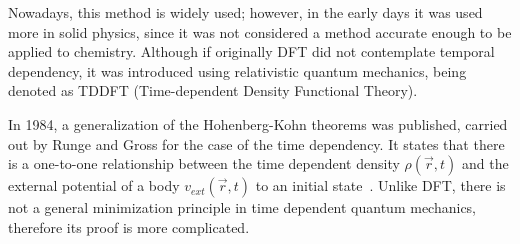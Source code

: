 Nowadays, this method is widely used; however, in the early days it was used
more in solid physics, since it was not considered a method accurate enough to
be applied to chemistry.  Although if originally DFT did not contemplate
temporal dependency, it was introduced using relativistic quantum mechanics,
being denoted as \gls{TDDFT} (Time-dependent Density Functional Theory).

In 1984, a generalization of the Hohenberg-Kohn theorems was published, carried
out by Runge and Gross for the case of the time dependency. It states that
there is a one-to-one relationship between the time dependent density $\rho
(\vec{r}, t)$ and the external potential of a body $v_{ext} (\vec{r}, t)$ to an
initial state~\cite{Runge1984}. Unlike DFT, there is not a general minimization
principle in time dependent quantum mechanics, therefore its proof is more
complicated.

%
%
%
%

